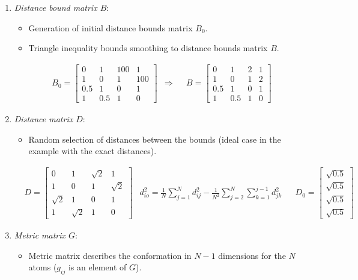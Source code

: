 \begin{enumerate}
    \item \emph{Distance bound matrix $B$}:
    \begin{itemize}
        \item Generation of initial distance bounds matrix $B_0$.
        \item Triangle inequality bounds smoothing to distance bounds matrix $B$.
    \end{itemize}
    \begin{align}
        &B_0=\begin{bmatrix} 0 & 1 & 100 & 1 \\ 1 & 0 & 1 & 100 \\ 0.5 & 1 & 0 & 1 \\ 1 & 0.5 & 1 & 0 \end{bmatrix}&\Rightarrow&&B=\begin{bmatrix} 0 & 1 & 2 & 1 \\ 1 & 0 & 1 & 2 \\ 0.5 & 1 & 0 & 1 \\ 1 & 0.5 & 1 & 0 \end{bmatrix}
    \end{align}
    \item \emph{Distance matrix $D$}:
    \begin{itemize}
        \item Random selection of distances between the bounds (ideal case in the example with the exact distances).
    \end{itemize}
    \begin{align}
        &D=\begin{bmatrix} 0 & 1 & \sqrt{2} & 1 \\ 1 & 0 & 1 & \sqrt{2} \\ \sqrt{2} & 1 & 0 & 1 \\ 1 & \sqrt{2} & 1 & 0 \end{bmatrix}&d_{io}^2=\frac{1}{N}\sum_{j=1}^{N}d_{ij}^2-\frac{1}{N^2}\sum_{j=2}^{N}\sum_{k=1}^{j-1}d_{jk}^2&&D_0=\begin{bmatrix} \sqrt{0.5} \\ \sqrt{0.5} \\ \sqrt{0.5} \\ \sqrt{0.5} \end{bmatrix}
    \end{align}
    \item \emph{Metric matrix $G$}:
    \begin{itemize}
        \item Metric matrix describes the conformation in $N-1$ dimensions for the $N$ atoms ($g_{ij}$ is an element of $G$).

\end{itemize}
\end{enumerate}
